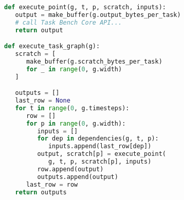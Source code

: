 \begin{lstlisting}[language=Python,caption={Excerpt from Dask implementation.\label{lst:code-sample}},float]
def execute_point(g, t, p, scratch, inputs):
   output = make_buffer(g.output_bytes_per_task)
   # call Task Bench Core API...
   return output

def execute_task_graph(g):
   scratch = [
      make_buffer(g.scratch_bytes_per_task)
      for _ in range(0, g.width)
   ]

   outputs = []
   last_row = None
   for t in range(0, g.timesteps):
      row = []
      for p in range(0, g.width):
         inputs = []
         for dep in dependencies(g, t, p):
            inputs.append(last_row[dep])
         output, scratch[p] = execute_point(
            g, t, p, scratch[p], inputs)
         row.append(output)
         outputs.append(output)
      last_row = row
   return outputs
\end{lstlisting}
